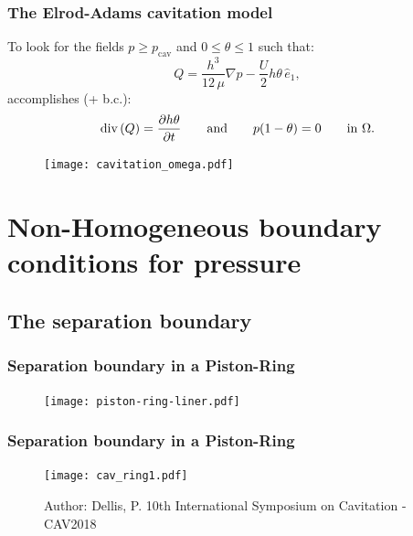 \documentclass[10pt,aspectratio=169]{beamer}
\begin{document}

\begin{frame}
\frametitle{The Elrod-Adams cavitation model}
\vspace*{1.0cm}
To look for the fields $p\geq p_{\text{cav}}$ and $0\leq \theta \leq 1$ such that: $$Q=\frac{h^3}{12\,\mu} \nabla p - \frac{U}{2}h\theta \, \hat{e}_1,$$ accomplishes (+ b.c.): $$\text{div} \left( Q \right) =\frac{\partial h\theta }{\partial t}\qquad \mbox{and}\qquad p(1-\theta)=0 \qquad \mbox{in }  \Omega.$$

\begin{figure}
	\centering
	\texttt{[image: cavitation\_omega.pdf]}
\end{figure}
\end{frame}


\section{Non-Homogeneous boundary conditions for pressure}
\subsection{The separation boundary}
\begin{frame}
\tableofcontents[
currentsection,
currentsubsection,
subsectionstyle=show/shaded/hide
]
\end{frame}

\begin{frame}
\frametitle{Separation boundary in a Piston-Ring}
\vspace*{1.0cm}
\begin{figure}
	\centering
	\texttt{[image: piston-ring-liner.pdf]}
\end{figure}
\end{frame}


\begin{frame}
\frametitle{Separation boundary in a Piston-Ring}
\vspace*{1.0cm}
\begin{figure}
	\centering
	\texttt{[image: cav\_ring1.pdf]}
	\caption{\color{ExecusharesGrey}\tiny Author: Dellis, P. 10th International Symposium on Cavitation - CAV2018}
\end{figure}
\end{frame}
\end{document}
